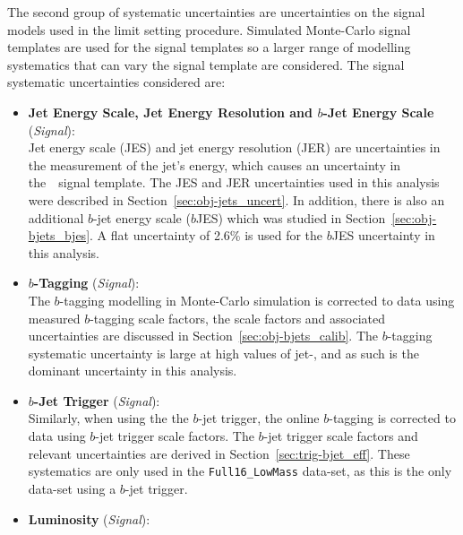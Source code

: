 The second group of systematic uncertainties are uncertainties on the signal models used in the limit setting procedure.
Simulated Monte-Carlo signal templates are used for the signal templates
so a larger range of modelling systematics that can vary the signal template are considered.
The signal systematic uncertainties considered are:

\begin{itemize}[leftmargin=*]
\item\textbf{Jet Energy Scale, Jet Energy Resolution  and $b$-Jet Energy Scale} \hspace{1mm} (\textit{Signal}):\\
  Jet energy scale (JES) and jet energy resolution (JER) are uncertainties in the measurement of the jet's energy,
  which causes an uncertainty in the~\mjj~signal template.
  The JES and JER uncertainties used in this analysis were described in Section~\ref{sec:obj-jets_uncert}.
  In addition, there is also an additional $b$-jet energy scale ($b$JES) which was studied in Section~\ref{sec:obj-bjets_bjes}.
  A flat uncertainty of 2.6\% is used for the $b$JES uncertainty in this analysis.
  \vspace{0.5em}
\item\textbf{$b$-Tagging} \hspace{1mm} (\textit{Signal}):\\
  The $b$-tagging modelling in Monte-Carlo simulation is corrected to data using measured $b$-tagging scale factors,
  the scale factors and associated uncertainties are discussed in Section~\ref{sec:obj-bjets_calib}.
  The $b$-tagging systematic uncertainty is large at high values of jet-\pT, and as such is the dominant uncertainty in this analysis.
  \vspace{0.5em}
\item\textbf{$b$-Jet Trigger} \hspace{1mm} (\textit{Signal}):\\
  Similarly, when using the the $b$-jet trigger, the online $b$-tagging is corrected to data using
  $b$-jet trigger scale factors.
  The $b$-jet trigger scale factors and relevant uncertainties are derived in Section~\ref{sec:trig-bjet_eff}.
  These systematics are only used in the \verb|Full16_LowMass| data-set, as this is the only data-set using a $b$-jet trigger.
  \vspace{0.5em}
\item\textbf{Luminosity} \hspace{1mm} (\textit{Signal}):\\

\end{itemize}

